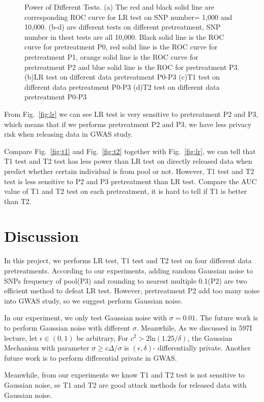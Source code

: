 \documentclass[12pt, singlespace]{article}
\begin{document}
\begin{figure}[ht!]
\begin{center}
{				}
	\end{center}
	\caption{%
Power of Different Tests. (a) The red and black solid line are corresponding ROC curve for LR test on SNP number= 1,000 and 10,000. (b-d) are different tests on different pretreatment, SNP number in thest tests are all 10,000. Black solid line is the ROC curve for pretreatment P0, red solid line is the ROC curve for pretreatment P1, orange solid line is the ROC curve for pretreatment P2 and blue solid line is the ROC for pretreatment P3. (b)LR test on different data pretreatment P0-P3 (c)T1 test on different data pretreatment P0-P3 (d)T2 test on different data pretreatment P0-P3
	}%
	\label{fig:subfigures}
\end{figure}

From Fig.~\ref{fig:lr} we can see LR test is very sensitive to pretreatment P2 and P3, which means that if we performs pretreatment P2 and P3, we have less privacy risk when releasing data in GWAS study. 

Compare Fig.~\ref{fig:t1} and Fig.~\ref{fig:t2} together with Fig.~\ref{fig:lr}, we can tell that T1 test and T2 test has less power than LR test on directly released data when predict whether certain individual is from pool or not. However, T1 test and T2 test is less sensitive to P2 and P3 pretreatment than LR test. Compare the AUC value of T1 and T2 test on each pretreatment, it is hard to tell if T1 is better than T2.
\section{Discussion}

In this project, we performs LR test, T1 test and T2 test on four different data pretreatments. According to our experiments, adding random Gaussian noise to SNPs frequency of pool(P3) and rounding to nearest multiple 0.1(P2) are two efficient method to defeat LR test. However, pretreatment P2 add too many noise into GWAS study, so we suggest perform Gaussian noise. 

In our experiment, we only test Gaussian noise with $\sigma=0.01$. The future work is to perform Gaussian noise with different $\sigma$. Meanwhile, As we discussed in 597I lecture, let $\epsilon\in(0,1)$ be arbitrary, For $c^2>2\mathrm{ln}(1.25/\delta)$, the Gaussian Mechanism with parameter $\sigma \ge c \Delta/\sigma$ is $(\epsilon,\delta)$- differentially private. Another future work is to perform differential private in GWAS.

Meanwhile, from our experiments we know T1 and T2 test is not sensitive to Gaussian noise, se T1 and T2 are good attack methods for released data with Gaussian noise.
\end{document}
